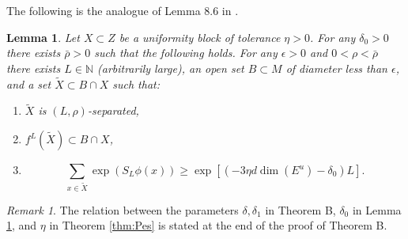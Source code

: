 \documentclass{amsart}
\theoremstyle{plain}
\newtheorem{lem}[thm]{Lemma}
\theoremstyle{definition}
\theoremstyle{remark}
\newtheorem{remark}[thm]{Remark}
\numberwithin{equation}{section}
\begin{document}


The following is the analogue of Lemma 8.6 in \cite{ACW}.

\begin{lem}\label{lem:Y}
Let $X\subset Z$ be a uniformity block of tolerance $\eta>0$.
For any $\delta_0>0$ there exists $\bar{\rho}>0$ such that the following holds.
For any $\epsilon>0$ and $0< \rho< \bar{\rho}$ there exists $L\in\mathbb{N}$  (arbitrarily large), an open set $B\subset M$ of diameter less than $\epsilon$, and a set $\tilde{X}\subset B  \cap X$ such that:
\begin{enumerate}
\item $\tilde{X}$ is $(L,\rho)$-separated,

\item $f^L(\tilde{X})\subset B\cap X$,

\item $$\sum_{x\in \tilde{X}} \exp(S_L\phi(x)) \geq \exp[(-3\eta d \dim(E^u) - \delta_0)L]. $$

\end{enumerate}
\end{lem}

\begin{remark}
The relation between the parameters $\delta, \delta_1$ in Theorem B, $\delta_0$ in Lemma \ref{lem:Y}, and $\eta$ in Theorem \ref{thm:Pes} is stated at the end of the proof of Theorem B.
\end{remark}
\end{document}

